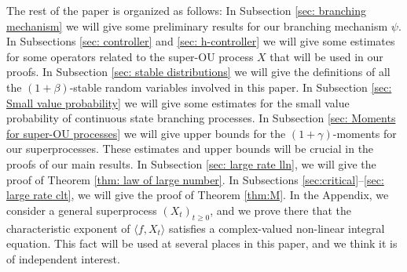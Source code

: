 \documentclass[12pt,a4paper]{amsart}
\theoremstyle{plain}
\theoremstyle{definition}
\numberwithin{equation}{section}
\begin{document}
The rest of the paper is organized as follows:
In Subsection \ref{sec: branching mechanism} we will give some preliminary results for our branching mechanism $\psi$.
In Subsections \ref{sec: controller} and \ref{sec: h-controller} we will give some estimates for some operators related to the super-OU process $X$ that will be used in our proofs.
In Subsection \ref{sec: stable distributions} we will give the definitions of all the $(1+\beta)$-stable random variables involved in this paper.
In Subsection \ref{sec: Small value probability} we will give some estimates for the small value probability of continuous state branching processes.
In Subsection \ref{sec: Moments for super-OU processes} we will give upper bounds for the $(1+\gamma)$-moments for our superprocesses.
These estimates and upper bounds will be crucial in the proofs of our main results.
In Subsection \ref{sec: large rate lln}, we will give the proof of Theorem \ref{thm: law of large number}.
In Subsections \ref{sec:critical}--\ref{sec: large rate clt}, we will give the proof of Theorem \ref{thm:M}.
In the Appendix, we consider a general superprocess $(X_t)_{t\geq 0}$, and we prove there that the characteristic exponent of $\langle f,X_t\rangle$ satisfies a complex-valued non-linear integral equation.
This fact will be used at several places in this paper, and we think it is of independent interest.
\begin{comment}
  We end this section with a list of frequently used notations:
  \begin{itemize}
  \item
    $\varphi$ and $\phi_p$ are given in \eqref{invariantdensity} and \eqref{eigenfunction}, respectively.
  \item
    $P_t$, $P^\alpha_t$, $V_t$ and $U_t$ are given in \eqref{eq: meansemigroup}, \eqref{eq: meansemigroup}, \eqref{eq: def of V_t}, \eqref{eq: def of U_t}, respectively.
  \item
    $\mathcal N$, $K$, $\mathcal C_l$ and $I_t$ are given in \eqref{eq: def of N}, \eqref{eq: def of N},  \eqref{eq: def of Cl} and \eqref{definition of Itf}, respectively.
  \item
    $\psi$, $\psi_1$ and $\psi_0$ are given in \eqref{eq: honogeneou branching mechanism}, \eqref{eq: psi 1} and \eqref{eq: psi 0}, respectively.
  \item
    $\Psi$, $\Psi_1$ and $\Psi_0$ are given in \eqref{eq: def of operator Psi}.
  \item
    $Z_t$, $Z'_t$, $Z''_t$ and $Z'''_t$ are given in \eqref{eq: def of Zf}.
  \item
    $Q_\kappa$ and $Q$ are given in \eqref{eq:Q} and \eqref{Q}, respectively.
  \item
    $m_t[f]$, $\bar m_t[f]$, $m[f]$, $\widetilde m[f]$ and $\bar m[f]$ are given in Lemma \ref{lem: def of all m}.
  \end{itemize}
\end{comment}
\end{document}
